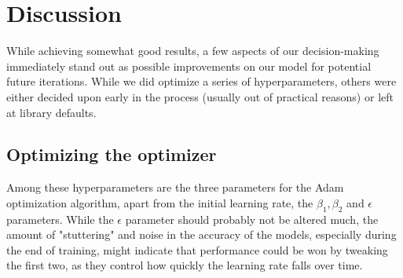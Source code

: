\section{Discussion}
While achieving somewhat good results, a few aspects of our decision-making immediately stand out as possible improvements on our model for potential future iterations. While we did optimize a series of hyperparameters, others were either decided upon early in the process (usually out of practical reasons) or left at library defaults.
\subsection{Optimizing the optimizer}
Among these hyperparameters are the three parameters for the Adam optimization algorithm, apart from the initial learning rate, the $\beta_1, \beta_2$ and $\epsilon$ parameters. While the $\epsilon$ parameter should probably not be altered much, the amount of "stuttering" and noise in the accuracy of the models, especially during the end of training, might indicate that performance could be won by tweaking the first two, as they control how quickly the learning rate falls over time.
